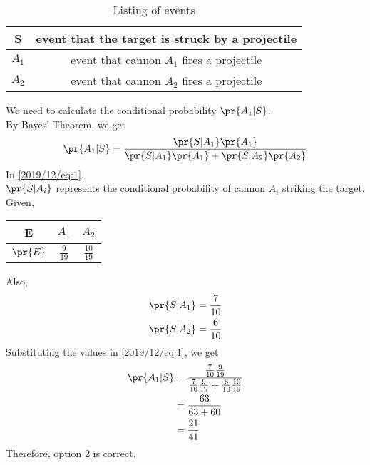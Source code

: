\begin{table}[h!]
    \centering
    \caption{Listing of events }
    \label{2019/12/table:1}
    \begin{tabular}{|c|c|}
        \hline
        S & {\small event that the target is struck by a projectile}\\[0.5ex]
        \hline
        $A_{1}$ & {\small event that cannon $A_{1}$ fires a projectile}\\[0.5ex]
        \hline
        $A_{2}$ & {\small event that cannon $A_{2}$ fires a projectile}\\[0.5ex]
        \hline
    \end{tabular}
    \end{table}
    We need to calculate the conditional probability $\pr{A_{1}|S}$.\\
    By Bayes' Theorem, we get 
    \begin{align}
    \label{2019/12/eq:1}
    \pr{A_{1}|S}=\frac{\pr{S|A_{1}}\pr{A_{1}}}{\pr{S|A_{1}}\pr{A_{1}}+\pr{S|A_{2}}\pr{A_{2}}}
    \end{align}
    In \eqref{2019/12/eq:1},\\
     $\pr{S|A_{i}}$ represents the conditional probability of cannon $A_{i}$ striking the target.\\
    Given,
    \begin{table}[h!]
    \centering
    \label{2019/12/table:2}
    \begin{tabular}{|c|c|c|}
        \hline
        E & $A_{1}$ & $A_{2}$\\
        \hline
        $\pr{E}$ & $\frac{9}{19}$ & $\frac{10}{19}$\\[1ex]
        \hline
    \end{tabular}
    \end{table}
    Also,
    \begin{align}
    \pr{S|A_{1}}=\frac{7}{10}\\
    \pr{S|A_{2}}=\frac{6}{10}\\
    \end{align}
    Substituting the values in \eqref{2019/12/eq:1}, we get
    \begin{align}
    \pr{A_{1}|S}={}&\frac{\frac{7}{10}\frac{9}{19}}{\frac{7}{10}\frac{9}{19}+\frac{6}{10}\frac{10}{19}}\\
    ={}&\frac{63}{63+60}\\
    ={}&\frac{21}{41}
    \end{align}
     Therefore, option 2 is correct.